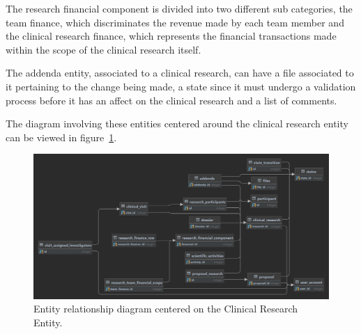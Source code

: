 The research financial component is divided into two different sub categories, the team finance, which discriminates the revenue made by each team member and the clinical research finance, which represents the financial transactions made within the scope of the clinical research itself.

The addenda entity, associated to a clinical research, can have a file associated to it pertaining to the change being made, a state since it must undergo a validation process before it has an affect on the clinical research and a list of comments.

The diagram involving these entities centered around the clinical research entity can be viewed in figure~\ref{fig:er-diagram-research}.


\begin{figure}[H]
    \centering
    \includegraphics[scale=0.15]{Chapters/img/model/research-centered-er-diagram.png}
    \caption{Entity relationship diagram centered on the Clinical Research Entity.}
    \label{fig:er-diagram-research}
\end{figure}

